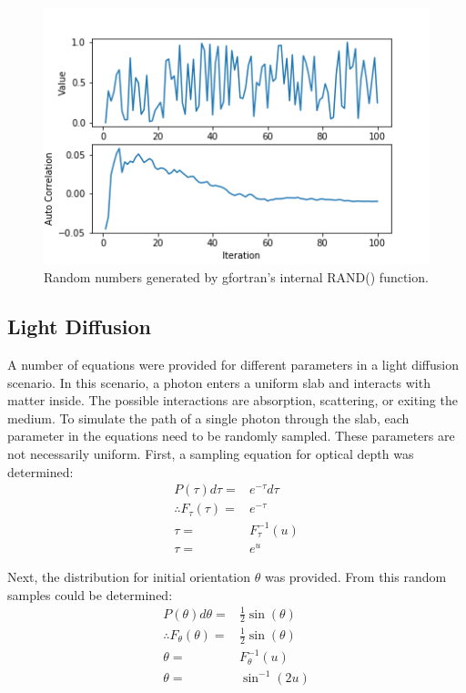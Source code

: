 \documentclass[twocolumn]{article}
\begin{document}
\begin{figure}
	\centering
	\includegraphics[width=0.7\linewidth]{fig5}
	\caption{Random numbers generated by gfortran's internal RAND() function.}
	\label{fig:fig4}
\end{figure}

\subsection{Light Diffusion}
A number of equations were provided for different parameters in a light diffusion scenario. In this scenario, a photon enters a uniform slab and interacts with matter inside. The possible interactions are absorption, scattering, or exiting the medium. To simulate the path of a single photon through the slab, each parameter in the equations need to be randomly sampled. These parameters are not necessarily uniform. First, a sampling equation for optical depth was determined:
\begin{equation}
\begin{split}
P(\tau) d\tau =& e^{-\tau} d\tau \\
\therefore F_{\tau}(\tau) =& e^{-\tau} \\
\tau =& F^{-1}_{\tau}(u) \\
\tau =& e^{u}
\end{split}
\end{equation}

Next, the distribution for initial orientation $\theta$ was provided. From this random samples could be determined:
\begin{equation}
\begin{split}
P(\theta) d\theta =& \frac{1}{2} \sin(\theta) \\
\therefore F_{\theta}(\theta) =& \frac{1}{2} \sin(\theta)\\
\theta =& F^{-1}_{\theta}(u) \\
\theta =& \sin^{-1}(2u)
\end{split}
\end{equation}
\end{document}
